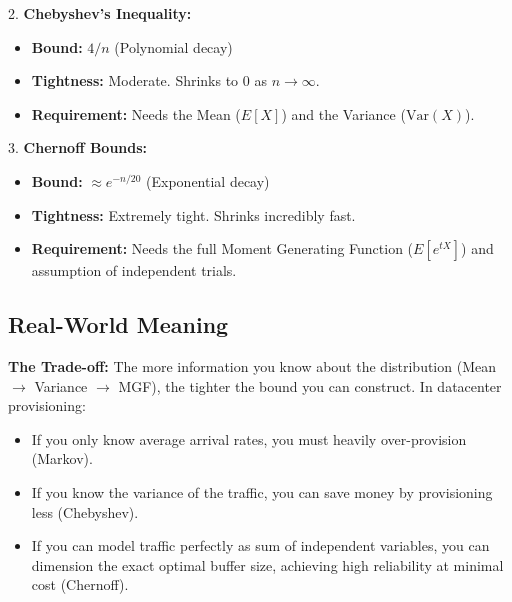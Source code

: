 \documentclass{article}
\begin{document}
2. \textbf{Chebyshev's Inequality:}
   \begin{itemize}
       \item \textbf{Bound:} $4/n$ (Polynomial decay)
       \item \textbf{Tightness:} Moderate. Shrinks to 0 as $n \to \infty$.
       \item \textbf{Requirement:} Needs the Mean ($E[X]$) and the Variance ($\text{Var}(X)$).
   \end{itemize}

3. \textbf{Chernoff Bounds:}
   \begin{itemize}
       \item \textbf{Bound:} $\approx e^{-n/20}$ (Exponential decay)
       \item \textbf{Tightness:} Extremely tight. Shrinks incredibly fast.
       \item \textbf{Requirement:} Needs the full Moment Generating Function ($E[e^{tX}]$) and assumption of independent trials.
   \end{itemize}

\subsection{Real-World Meaning}
\textbf{The Trade-off:} The more information you know about the distribution (Mean $\rightarrow$ Variance $\rightarrow$ MGF), the tighter the bound you can construct. 
In datacenter provisioning:
\begin{itemize}
    \item If you only know average arrival rates, you must heavily over-provision (Markov).
    \item If you know the variance of the traffic, you can save money by provisioning less (Chebyshev).
    \item If you can model traffic perfectly as sum of independent variables, you can dimension the exact optimal buffer size, achieving high reliability at minimal cost (Chernoff).
\end{itemize}
\end{document}
